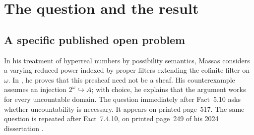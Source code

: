 \documentclass[11pt,letterpaper]{article}
\theoremstyle{definition}
\theoremstyle{remark}
\newcommand{\om}{\omega}
\newcommand{\ZF}{\mathsf{ZF}}
\newcommand{\ZFC}{\mathsf{ZFC}}
\begin{document}
\begin{abstract}
Massas asks whether uncountability is necessary for the reduced-power
presheaf associated with a structure to fail the sheaf condition on the
Fr\'echet category. We give a negative answer using only two distinct elements.
Partition $\om$ into infinitely many infinite rows. The filters concentrated
on individual rows, together with the filter concentrated on tails of rows,
generate a dense covering sieve. Assign one constant value on every row
component and a different constant value on the tail component. These
sections match because the components are incompatible. A global sequence
would nevertheless have to take both values cofinitely on one infinite row.
The construction and the resulting classification are proved in $\ZF$.
We also prove separatedness, a finite-pasting theorem showing that the
countable number of generators is sharp, and failure above every countably
generated free filter without any choice axiom. Under dependent choice,
sheafness above an arbitrary base filter is equivalent, for a nontrivial
value set, to finiteness of its quotient Boolean algebra. Finally, in
$\ZFC$, we identify the associated sheaf with a product of ultrapowers and
explain the obstruction as a missing two-valued section. Every extension is
proved independently of the literature, with its foundational assumptions
stated explicitly.
\end{abstract}

\tableofcontents
\newpage

\section{The question and the result}
\label{sec:question}

\subsection{A specific published open problem}
In his treatment of hyperreal numbers by possibility semantics, Massas
considers a varying reduced power indexed by proper filters extending the
cofinite filter on $\om$. In \cite[Definitions 5.4--5.7 and Fact 5.10]{Massas2023},
he proves that this presheaf need not be a sheaf. His counterexample assumes
an injection $2^\om\hookrightarrow A$; with choice, he explains that the
argument works for every uncountable domain. The question immediately after
Fact~5.10 asks whether uncountability is necessary. It appears on printed
page~517. The same question is repeated after Fact~7.4.10, on printed
page~249 of his 2024 dissertation \cite{Massas2024}.
\end{document}
